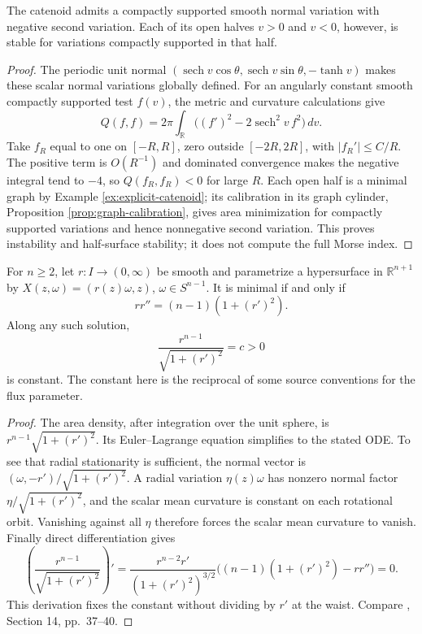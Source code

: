 \begin{proposition}\label{prop:catenoid-unstable-example}
The catenoid admits a compactly supported smooth normal variation with negative second variation. Each of its open halves $v>0$ and $v<0$, however, is stable for variations compactly supported in that half.
\end{proposition}
\begin{proof}
The periodic unit normal $(\operatorname{sech}v\cos\theta,\operatorname{sech}v\sin\theta,-\tanh v)$ makes these scalar normal variations globally defined. For an angularly constant smooth compactly supported test $f(v)$, the metric and curvature calculations give
\[
 Q(f,f)=2\pi\int_{\mathbb R}\bigl((f')^2-2\operatorname{sech}^2v\,f^2\bigr)\,dv.
\]
Take $f_R$ equal to one on $[-R,R]$, zero outside $[-2R,2R]$, with $|f_R'|\leq C/R$. The positive term is $O(R^{-1})$ and dominated convergence makes the negative integral tend to $-4$, so $Q(f_R,f_R)<0$ for large $R$. Each open half is a minimal graph by Example \ref{ex:explicit-catenoid}; its calibration in its graph cylinder, Proposition \ref{prop:graph-calibration}, gives area minimization for compactly supported variations and hence nonnegative second variation. This proves instability and half-surface stability; it does not compute the full Morse index.
\end{proof}

\begin{proposition}\label{prop:rotational-catenoid-ode}
For $n\geq2$, let $r:I\to(0,\infty)$ be smooth and parametrize a hypersurface in $\mathbb R^{n+1}$ by $X(z,\omega)=(r(z)\omega,z)$, $\omega\in S^{n-1}$. It is minimal if and only if
\[
 rr''=(n-1)(1+(r')^2).
\]
Along any such solution,
\[
 \frac{r^{n-1}}{\sqrt{1+(r')^2}}=c>0
\]
is constant. The constant here is the reciprocal of some source conventions for the flux parameter.
\end{proposition}
\begin{proof}
The area density, after integration over the unit sphere, is $r^{n-1}\sqrt{1+(r')^2}$. Its Euler--Lagrange equation simplifies to the stated ODE. To see that radial stationarity is sufficient, the normal vector is $(\omega,-r')/\sqrt{1+(r')^2}$. A radial variation $\eta(z)\omega$ has nonzero normal factor $\eta/\sqrt{1+(r')^2}$, and the scalar mean curvature is constant on each rotational orbit. Vanishing against all $\eta$ therefore forces the scalar mean curvature to vanish. Finally direct differentiation gives
\[
 \left(\frac{r^{n-1}}{\sqrt{1+(r')^2}}\right)'
 =\frac{r^{n-2}r'}{(1+(r')^2)^{3/2}}
 \bigl((n-1)(1+(r')^2)-rr''\bigr)=0.
\]
This derivation fixes the constant without dividing by $r'$ at the waist. Compare \cite{ChMin}, Section 14, pp.~37--40.
\end{proof}

